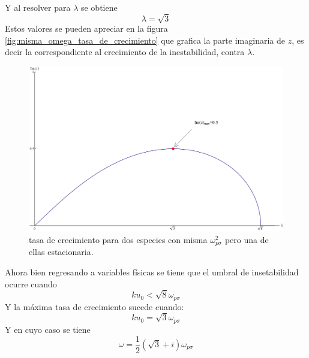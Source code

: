 \documentclass[12pt]{article}
\begin{document}
Y al resolver para $\lambda$ se obtiene
\begin{equation}
\lambda = \sqrt{3}
\end{equation}
Estos valores se pueden apreciar en la figura \ref{fig:misma_omega_tasa_de_crecimiento} que grafica la parte imaginaria de $z$, es decir la correspondiente al crecimiento de la inestabilidad, contra $\lambda$. 
\begin{figure}[!h]
\includegraphics[height=0.3\paperheight]{grafica_misma_omega_reposo.png}
\caption{tasa de crecimiento para dos especies con misma $\omega_{p\sigma}^2$ pero una de ellas estacionaria.}
\label{fig:misma_omega_reposo}
\end{figure}
Ahora bien regresando a variables físicas se tiene que el umbral de insetabilidad ocurre cuando
\begin{equation}
ku_0 < \sqrt{8} \omega_{p\sigma}
\end{equation}
Y la máxima tasa de crecimiento sucede cuando:
\begin{equation}
ku_0= \sqrt{3} \omega_{p\sigma}
\end{equation}
Y en cuyo caso se tiene
\begin{equation}
\omega = \frac{1}{2} (\sqrt{3} + i)\omega_{p\sigma}
\end{equation}
\end{document}
